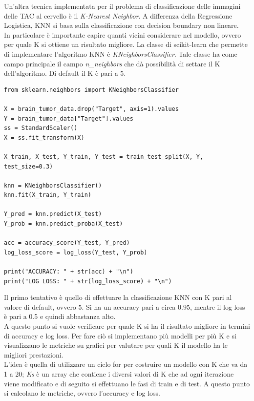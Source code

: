 Un'altra tecnica implementata per il problema di classificazione delle immagini delle TAC al cervello è il \textit{K-Nearest Neighbor}. A differenza della Regressione Logistica, KNN si basa sulla classificazione con decision boundary non lineare.\\
In particolare è importante capire quanti vicini considerare nel modello, ovvero per quale K si ottiene un risultato migliore.
La classe di scikit-learn che permette di implementare l'algoritmo KNN è \textit{KNeighborsClassifier}. Tale classe ha come campo principale il campo \textit{n\_neighbors} che dà possibilità di settare il K dell'algoritmo. Di default il K è pari a 5.
\begin{lstlisting}
from sklearn.neighbors import KNeighborsClassifier

X = brain_tumor_data.drop("Target", axis=1).values
Y = brain_tumor_data["Target"].values
ss = StandardScaler()
X = ss.fit_transform(X)

X_train, X_test, Y_train, Y_test = train_test_split(X, Y, test_size=0.3)

knn = KNeighborsClassifier()
knn.fit(X_train, Y_train)

Y_pred = knn.predict(X_test)
Y_prob = knn.predict_proba(X_test)

acc = accuracy_score(Y_test, Y_pred)
log_loss_score = log_loss(Y_test, Y_prob)

print("ACCURACY: " + str(acc) + "\n")
print("LOG LOSS: " + str(log_loss_score) + "\n")
\end{lstlisting}
Il primo tentativo è quello di effettuare la classificazione KNN con K pari al valore di default, ovvero 5. Si ha un accuracy pari a circa 0.95, mentre il log loss è pari a 0.5 e quindi abbastanza alto.\\
A questo punto si vuole verificare per quale K si ha il risultato migliore in termini di accuracy e log loss. Per fare ciò si implementano più modelli per più K e si visualizzano le metriche su grafici per valutare per quali K il modello ha le migliori prestazioni.\\
L'idea è quella di utilizzare un ciclo for per costruire un modello con K che va da 1 a 20; \textit{Ks} è un array che contiene i diversi valori di K che ad ogni iterazione viene modificato e di seguito si effettuano le fasi di train e di test. A questo punto si calcolano le metriche, ovvero l'accuracy e log loss.
